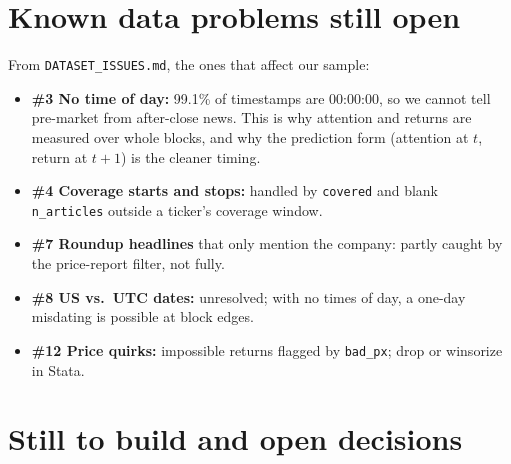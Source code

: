 \documentclass[11pt]{article}
\newcommand{\var}[1]{\texttt{#1}}
\begin{document}
\section{Known data problems still open}

From \var{DATASET\_ISSUES.md}, the ones that affect our sample:
\begin{itemize}
  \item \textbf{\#3 No time of day:} 99.1\% of timestamps are 00:00:00, so we cannot tell pre-market from after-close news. This is why attention and returns are measured over whole blocks, and why the prediction form (attention at $t$, return at $t+1$) is the cleaner timing.
  \item \textbf{\#4 Coverage starts and stops:} handled by \var{covered} and blank \var{n\_articles} outside a ticker's coverage window.
  \item \textbf{\#7 Roundup headlines} that only mention the company: partly caught by the price-report filter, not fully.
  \item \textbf{\#8 US vs.\ UTC dates:} unresolved; with no times of day, a one-day misdating is possible at block edges.
  \item \textbf{\#12 Price quirks:} impossible returns flagged by \var{bad\_px}; drop or winsorize in Stata.
\end{itemize}

\section{Still to build and open decisions}
\end{document}
